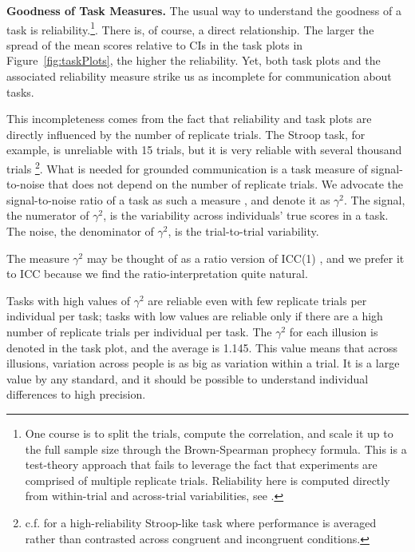 {\bf Goodness of Task Measures.}  The usual way to understand the goodness of a task is reliability.\footnote{One course is to split the trials, compute the correlation, and scale it up to the full sample size through the Brown-Spearman prophecy formula.  This is a test-theory approach that fails to leverage the fact that experiments are comprised of multiple replicate trials.  Reliability here is computed directly from within-trial and across-trial variabilities, see \textcite{Rouder.Mehrvarz.2024}.}.    There is, of course, a direct relationship.  The larger the spread of the mean scores relative to CIs in the task plots in Figure~\ref{fig:taskPlots}, the higher the reliability.  Yet, both task plots and the associated reliability measure strike us as incomplete for communication about tasks.  



This incompleteness comes from the fact that reliability and task plots are directly influenced by the number of replicate trials.  The Stroop task, for example, is unreliable with 15 trials, but it is very reliable with several thousand trials \parencite[]{Lee.etal.2023}\footnote{c.f. \textcite{Burgoyne.etal.2023} for a high-reliability Stroop-like task where performance is averaged rather than contrasted across congruent and incongruent conditions.}.  What is needed for grounded communication is a task measure of signal-to-noise that does not depend on the number of replicate trials.  We advocate the signal-to-noise ratio of a task as such a measure \parencite[]{Rouder.Mehrvarz.2024}, and denote it as $\gamma^2$.  The signal, the numerator of $\gamma^2$, is the variability across individuals' true scores in a task.  The noise, the denominator of $\gamma^2$, is the trial-to-trial variability. 

The measure $\gamma^2$ may be thought of as a ratio version of ICC(1) \parencite[]{Liljequist.etal.2019}, and we prefer it to ICC because we find the ratio-interpretation quite natural.

 
 Tasks with high values of $\gamma^2$ are reliable even with few replicate trials per individual per task; tasks with low values are reliable only if there are a high number of replicate trials per individual per task.  The $\gamma^2$ for each illusion is denoted in the task plot, and the average is 1.145.  This value means that across illusions, variation across people is as big as variation within a trial.  It is a large value by any standard, and it should be possible to understand individual differences to high precision.


